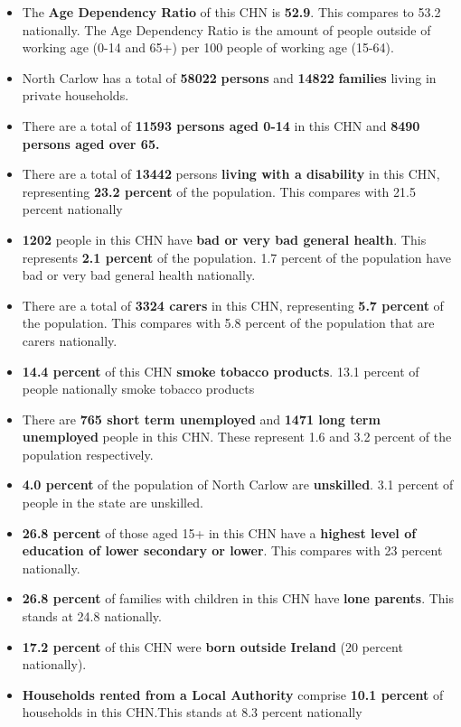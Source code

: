 \documentclass{article}
\begin{document}
\begin{itemize}

\item The \textbf{Age Dependency Ratio} of this CHN is  \textbf{52.9}. This compares to 53.2 nationally. The Age Dependency Ratio is the amount of people outside of working age (0-14 and 65+) per 100 people of working age (15-64). 

\item North Carlow has a total of \textbf{\num{58022}} \textbf{persons} and  \textbf{\num{14822}} \textbf{families} living in private households.

\item There are a total of \textbf{\num{11593} persons aged 0-14} in this CHN and \textbf{\num{8490} persons aged over 65.} 

\item There are a total of \textbf{\num{13442}} persons \textbf{living with a disability} in this CHN, representing \textbf{23.2 percent} of the population. This compares with  21.5 percent nationally

\item \textbf{\num{1202}} people in this CHN have \textbf{bad or very bad general health}. This represents \textbf{2.1 percent} of the population. 1.7 percent of the population have bad or very bad general health nationally. 

\item There are a total of \textbf{\num{3324} carers} in this CHN, representing \textbf{5.7 percent} of the population. This compares with 5.8 percent of the population that are carers nationally. 

\item \textbf{14.4 percent} of this CHN \textbf{smoke tobacco products}. 13.1 percent of people nationally smoke tobacco products

\item There are \textbf{\num{765} short term unemployed} and \textbf{\num{1471} long term unemployed} people in this CHN. These represent 1.6 and 3.2 percent of the population respectively.

\item  \textbf{4.0 percent} of the population of North Carlow are \textbf{unskilled}. 3.1 percent of people in the state are unskilled.

\item \textbf{26.8 percent} of those aged 15+ in this CHN have a \textbf{highest level of education of lower secondary or lower}. This compares with 23 percent nationally. 

\item \textbf{26.8 percent} of families with children in this CHN have \textbf{lone parents}. This stands at 24.8 nationally.

\item \textbf{17.2 percent} of this CHN were \textbf{born outside Ireland} (20 percent nationally).

\item \textbf{Households rented from a Local Authority} comprise \textbf{10.1 percent} of households in this CHN.This stands at 8.3 percent nationally

\end{itemize}
\end{document}
